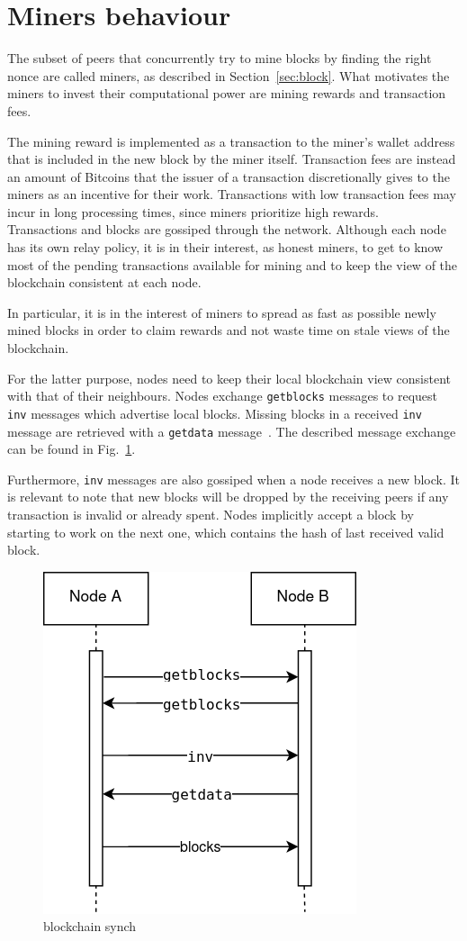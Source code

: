 \section{Miners behaviour}\label{sec:miners}
The subset of peers that concurrently try to mine blocks by finding the right nonce are called miners, as described in Section~\ref{sec:block}. What motivates the miners to invest their computational power are mining rewards and transaction fees.

The mining reward is implemented as a transaction to the miner's wallet address that is included in the new block by the miner itself. Transaction fees are instead an amount of Bitcoins that the issuer of a transaction discretionally gives to the miners as an incentive for their work. Transactions with low transaction fees may incur in long processing times, since miners prioritize high rewards.\\

Transactions and blocks are gossiped through the network. Although each node has its own relay policy, it is in their interest, as honest miners, to get to know most of the pending transactions available for mining and to keep the view of the blockchain consistent at each node.

In particular, it is in the interest of miners to spread as fast as possible newly mined blocks in order to claim rewards and not waste time on stale views of the blockchain.

For the latter purpose, nodes need to keep their local blockchain view consistent with that of their neighbours. Nodes exchange \texttt{getblocks} messages to request \texttt{inv} messages which advertise local blocks. Missing blocks in a received \texttt{inv} message are retrieved with a \texttt{getdata} message~\cite{protocoldoc}. The described message exchange can be found in Fig.~\ref{fig:synch}.

Furthermore, \texttt{inv} messages are also gossiped when a node receives a new block. It is relevant to note that new blocks will be dropped by the receiving peers if any transaction is invalid or already spent. Nodes implicitly accept a block by starting to work on the next one, which contains the hash of last received valid block. 

\begin{figure}[h]
	\includegraphics[width=.35\textwidth]{pict/blockchain-synch.png}
	\centering
	\caption{blockchain synch}
	\label{fig:synch}
\end{figure}

